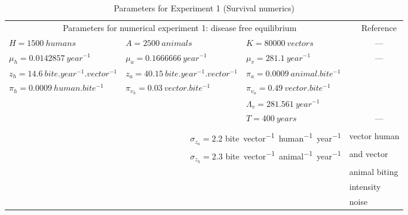 \begin{table}[p]
	\centering
	\caption{Parameters for Experiment 1 (Survival numerics)}
	\label{tbl:free_disease_parameters}
	\begin{tabular}{@{}llllc@{}}
		\toprule
		\multicolumn{4}{c}{%
			Parameters for numerical experiment 1: disease free 
			equilibrium %
			} & \multicolumn{1}{c}{Reference}
		\\
		\cmidrule{1-3}
		$H = \num{1500}  ~\si{humans}$		&
		$A = \num{2500}  ~\si{animals}$		& 
		$K = \num{80000} ~\si{vectors}$		&
		& ---
		\\
		$\mu_h=0.0142857~\si{year^{-1}}$	&$\mu_a=0.1666666 ~\si{year^{-1}}$	& 
		$\mu_v=281.1 ~\si{year^{-1}}$ 		&																		& ---
		\\
		$z_h=14.6 ~\si{bite.year^{-1}.vector^{-1}}$			&
		$z_a=40.15~\si{bite.year^{-1}.vector^{-1}}$			&
		$\pi_{a} = \num{0.0009} ~\si{animal.bite^{-1}}$	&
		&\cite{Cruz-Pacheco2012a}
		\\
		$\pi_{h} = \num{0.0009} ~\si{human.bite^{-1}}$	 	& 
		$\pi_{v_h} = \num{0.03} ~\si{vector.bite^{-1}}$		& 
		$\pi_{v_a} = \num{0.49} ~\si{vector.bite^{-1}}$		&
		& \cite{Cohen2001}
		\\
		&&$\Lambda_v=281.561 ~\si{year^{-1}}$ &&	\cite{Rabinovich1972}
		\\
		&& $T=400 ~\si{years}$&& ---
		\\
		\\
		&\multicolumn{2}{r}{
					$\sigma_{z_a} = \num{2.2}$
					\si{bite.vector^{-1}.human^{-1}.year^{-1}}
				}
		&
		\multicolumn{2}{l}{vector human}		\\
		&
		\multicolumn{2}{r}{%
			$\sigma_{z_h} = \num{2.3}$
			\si{bite.vector^{-1}.animal^{-1}.year^{-1}}
		}
		&
		\multicolumn{2}{l}{and vector}			\\
		&
		&& 
		\multicolumn{2}{l}{animal biting}	\\
		&
		&
		&
		\multicolumn{2}{l}{intensity}\\
		&&&
		\multicolumn{2}{l}{noise}\\
		\bottomrule
	\end{tabular}
\end{table}